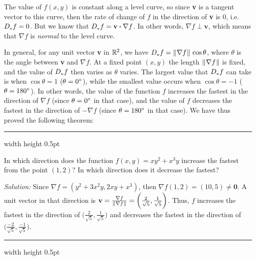 The value of $f(x,y)$ is constant along a level curve, so since \textbf{v} is a tangent vector to this curve, then
the rate of change of $f$ in the direction of \textbf{v} is 0, i.e. $D_{\scriptscriptstyle \textbf{v}}f = 0$. 
But we know that
$D_{\scriptscriptstyle \textbf{v}}f = \textbf{v} \bm{\cdot} \nabla f$.
In other words, $\nabla f
\perp \textbf{v}$, which means that $\nabla f$ is \emph{normal} to the level curve.

In general, for any unit vector \textbf{v} in $\mathbb{R}^{2}$, we have 
$D_{\scriptscriptstyle \textbf{v}}f = \lVert\mspace{1mu}\nabla f\mspace{1mu}\rVert\,\cos \theta$, where $\theta$ is the angle between \textbf{v} and $\nabla f$.
At a fixed point $(x,y)$ the length $\lVert\mspace{1mu}\nabla f\mspace{1mu}\rVert$ is fixed,
and the value of $D_{\scriptscriptstyle \textbf{v}}f$ then varies as $\theta$ varies. The largest value
that $D_{\scriptscriptstyle \textbf{v}}f$ can take is when $\cos \theta = 1$ ($\theta = 0^\circ$), while the smallest value occurs
when $\cos \theta = -1$ ($\theta = 180^\circ$). In other words, the value of the function $f$ increases the fastest
in the direction of $\nabla f$ (since $\theta = 0^\circ$ in that case), and the value of $f$ decreases the fastest in
the direction of $-\nabla f$ (since $\theta = 180^\circ$ in that case). We have thus proved the following theorem:


\medskip
\hrule width \textwidth height 0.5pt
\begin{exmp}
 In which direction does the function $f(x,y) = xy^2 + x^3 y$ increase the fastest from the point $(1,2)$?
 In which direction does it decrease the fastest?\smallskip
 \par\noindent\emph{Solution:} Since $\nabla f = (y^2 + 3x^2 y, 2xy + x^3)$, then
 $\nabla f(1,2) = (10,5) \ne \textbf{0}$. 
 A unit vector in that direction is $\textbf{v} =
 \frac{\nabla f}{\lVert\mspace{1mu}\nabla f\mspace{1mu}\rVert} = \biggl( \frac{2}{\sqrt{5}}, \frac{1}{\sqrt{5}} \biggr)$. 
 Thus, $f$ increases the
 fastest in the direction of $\biggl( \frac{2}{\sqrt{5}}, \frac{1}{\sqrt{5}} \biggr)$ and decreases the fastest in
 the direction of $\biggl( \frac{-2}{\sqrt{5}}, \frac{-1}{\sqrt{5}} \biggr)$.
\end{exmp}
\hrule width \textwidth height 0.5pt
\medskip

